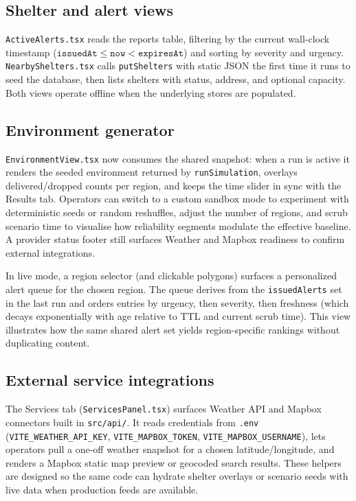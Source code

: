\subsection{Shelter and alert views}
\texttt{ActiveAlerts.tsx} reads the reports table, filtering by the current wall-clock timestamp ($\texttt{issuedAt} \leq \texttt{now} < \texttt{expiresAt}$) and sorting by severity and urgency. \texttt{NearbyShelters.tsx} calls \texttt{putShelters} with static JSON the first time it runs to seed the database, then lists shelters with status, address, and optional capacity. Both views operate offline when the underlying stores are populated.

\subsection{Environment generator}
\texttt{EnvironmentView.tsx} now consumes the shared snapshot: when a run is active it renders the seeded environment returned by \texttt{runSimulation}, overlays delivered/dropped counts per region, and keeps the time slider in sync with the Results tab. Operators can switch to a custom sandbox mode to experiment with deterministic seeds or random reshuffles, adjust the number of regions, and scrub scenario time to visualise how reliability segments modulate the effective baseline. A provider status footer still surfaces Weather and Mapbox readiness to confirm external integrations.

In live mode, a region selector (and clickable polygons) surfaces a personalized alert queue for the chosen region. The queue derives from the \texttt{issuedAlerts} set in the last run and orders entries by urgency, then severity, then freshness (which decays exponentially with age relative to TTL and current scrub time). This view illustrates how the same shared alert set yields region-specific rankings without duplicating content.

\subsection{External service integrations}
The Services tab (\texttt{ServicesPanel.tsx}) surfaces Weather API and Mapbox connectors built in \texttt{src/api/}. It reads credentials from \texttt{.env} (\texttt{VITE\_WEATHER\_API\_KEY}, \texttt{VITE\_MAPBOX\_TOKEN}, \texttt{VITE\_MAPBOX\_USERNAME}), lets operators pull a one-off weather snapshot for a chosen latitude/longitude, and renders a Mapbox static map preview or geocoded search results. These helpers are designed so the same code can hydrate shelter overlays or scenario seeds with live data when production feeds are available.

